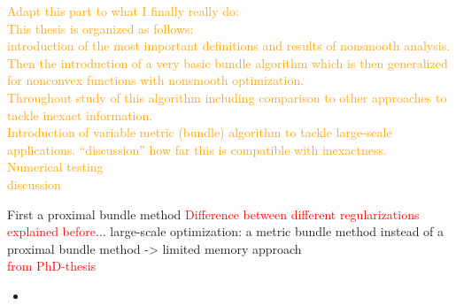 \textcolor{orange}{Adapt this part to what I finally really do: \\
This thesis is organized as follows: \\
introduction of the most important definitions and results of nonsmooth analysis. Then the introduction of a very basic bundle algorithm which is then generalized for nonconvex functions with nonsmooth optimization. \\
Throughout study of this algorithm including comparison to other approaches to tackle inexact information. \\
Introduction of variable metric (bundle) algorithm to tackle large-scale applications. ``discussion'' how far this is compatible with inexactness. \\
Numerical testing \\ 
discussion}


First a proximal bundle method \textcolor{red}{Difference between different regularizations explained before}...
large-scale optimization: a metric bundle method instead of a proximal bundle method -> limited memory approach \\


\textcolor{red}{from PhD-thesis}
\begin{itemize}
	\item 
\end{itemize}
